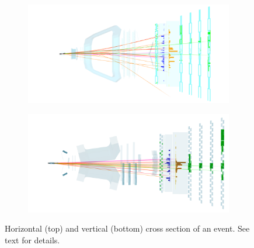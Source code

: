 \begin{figure}[!t]
  \centering
  \begin{subfigure}{\textwidth}
    \includegraphics[width=\textwidth]{Figures/Chapter2/top}
    \label{det_evt_display_top}
  \end{subfigure}
  \begin{subfigure}{\textwidth}
    \includegraphics[width=\textwidth]{Figures/Chapter2/side}
    \label{det_evt_display_side}
  \end{subfigure}
  \caption{Horizontal (top) and vertical (bottom) cross section of an \lhcb event. See text for details.}
  \label{det_evt_display}
\end{figure}
